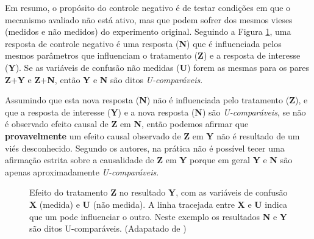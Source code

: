 \documentclass[final,5p]{elsarticle}
\numberwithin{equation}{section}
\begin{document}
    Em resumo, o propósito do controle negativo é de testar condições em que o mecanismo avaliado não está ativo, mas que podem sofrer dos mesmos vieses (medidos e não medidos) do experimento original. Seguindo a Figura \ref{fig:diagrama_confusao}, uma resposta de controle negativo é uma resposta (\textbf{N}) que é influenciada pelos mesmos parâmetros que influenciam o tratamento (\textbf{Z}) e a resposta de interesse (\textbf{Y}). Se as variáveis de confusão não medidas (\textbf{U}) forem as mesmas para os pares \textbf{Z}+\textbf{Y} e \textbf{Z}+\textbf{N}, então \textbf{Y} e \textbf{N} são ditos \textit{U-comparáveis}.

    Assumindo que esta nova resposta (\textbf{N}) não é influenciada pelo tratamento (\textbf{Z}), e que a resposta de interesse (\textbf{Y}) e a nova resposta (\textbf{N}) são \textit{U-comparáveis}, se não é observado efeito causal de \textbf{Z} em \textbf{N}, então podemos afirmar que \textbf{provavelmente} um efeito causal observado de \textbf{Z} em \textbf{Y} não é resultado de um viés desconhecido. Segundo os autores, na prática não é possível tecer uma afirmação estrita sobre a causalidade de \textbf{Z} em \textbf{Y} porque em geral \textbf{Y} e \textbf{N} são apenas aproximadamente \textit{U-comparáveis}.

    \begin{figure}[hbt!]
        \centering
        \caption{Efeito do tratamento \textbf{Z} no resultado \textbf{Y}, com as variáveis de confusão \textbf{X} (medida) e \textbf{U} (não medida). A linha tracejada entre \textbf{X} e \textbf{U} indica que um pode influenciar o outro. Neste exemplo os resultados \textbf{N} e \textbf{Y} são ditos U-comparáveis. (Adapatado de \cite{lipsitch2010negative})}
        \label{fig:diagrama_confusao}
    \end{figure}
\end{document}
